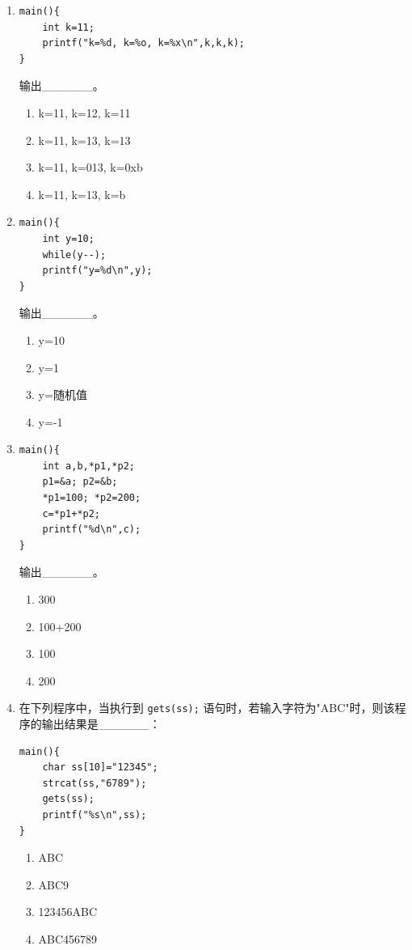 \documentclass[a4paper,12pt]{article}
\begin{document}
\begin{enumerate}
	\item
	      \begin{verbatim}
main(){
    int k=11;
    printf("k=%d, k=%o, k=%x\n",k,k,k);
}
    \end{verbatim}
	      输出\_\_\_\_\_\_。
	      \begin{enumerate}
		      \item[A)] k=11, k=12, k=11
		      \item[B)] k=11, k=13, k=13
		      \item[C)] k=11, k=013, k=0xb
		      \item[D)] k=11, k=13, k=b
	      \end{enumerate}
	      \vspace{0.3cm}

	\item
	      \begin{verbatim}
main(){
    int y=10;
    while(y--);
    printf("y=%d\n",y);
}
    \end{verbatim}
	      输出\_\_\_\_\_\_。
	      \begin{enumerate}
		      \item[A)] y=10
		      \item[B)] y=1
		      \item[C)] y=随机值
		      \item[D)] y=-1
	      \end{enumerate}
	      \vspace{0.3cm}

	\item
	      \begin{verbatim}
main(){
    int a,b,*p1,*p2;
    p1=&a; p2=&b;
    *p1=100; *p2=200;
    c=*p1+*p2;
    printf("%d\n",c);
}
    \end{verbatim}
	      输出\_\_\_\_\_\_。
	      \begin{enumerate}
		      \item[A)] 300
		      \item[B)] 100+200
		      \item[C)] 100
		      \item[D)] 200
	      \end{enumerate}
	      \vspace{0.3cm}

	\item 在下列程序中，当执行到 \texttt{gets(ss);} 语句时，若输入字符为"ABC"时，则该程序的输出结果是\_\_\_\_\_\_：
	      \begin{verbatim}
main(){
    char ss[10]="12345";
    strcat(ss,"6789");
    gets(ss);
    printf("%s\n",ss);
}
    \end{verbatim}
	      \begin{enumerate}
		      \item[A)] ABC
		      \item[B)] ABC9
		      \item[C)] 123456ABC
		      \item[D)] ABC456789
	      \end{enumerate}
	      \vspace{0.3cm}


\end{enumerate}
\end{document}
